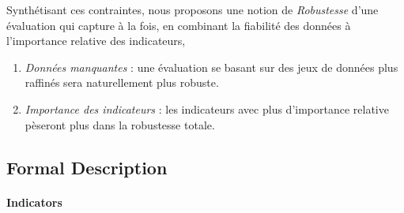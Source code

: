 {Synthétisant ces contraintes, nous proposons une notion de \emph{Robustesse} d'une évaluation qui capture à la fois, en combinant la fiabilité des données à l'importance relative des indicateurs,


\begin{enumerate}
\item \emph{Données manquantes} : une évaluation se basant sur des jeux de données plus raffinés sera naturellement plus robuste.
\item \emph{Importance des indicateurs} : les indicateurs avec plus d'importance relative pèseront plus dans la robustesse totale.
\end{enumerate}
}




\subsection{Formal Description}


\paragraph{Indicators}


